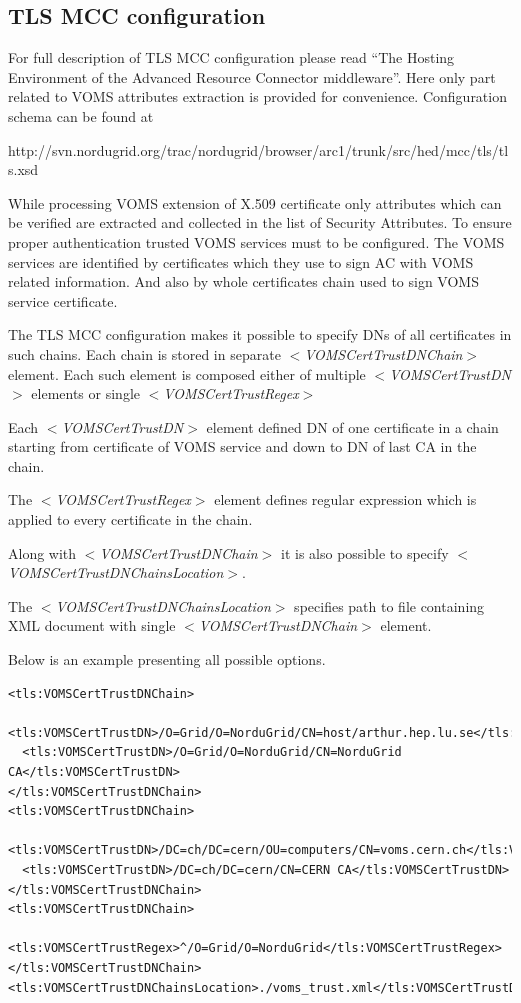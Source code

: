 \documentclass{article}                            %
\begin{document}
\subsection{TLS MCC configuration} %
\label{subsec:tlsmcc_conf}
For full description of TLS MCC configuration please read ``The Hosting Environment of the Advanced Resource Connector middleware''. Here only part related to VOMS attributes extraction is provided for convenience. Configuration schema can be found at 

http://svn.nordugrid.org/trac/nordugrid/browser/arc1/trunk/src/hed/mcc/tls/tls.xsd

While processing VOMS extension of X.509 certificate only attributes which can be verified are extracted and collected in the list of Security Attributes. To ensure proper authentication trusted VOMS services must to be configured. The VOMS services are identified by certificates which they use to sign AC with VOMS related information. And also by whole certificates chain used to sign VOMS service certificate. 

The TLS MCC configuration makes it possible to specify DNs of all certificates in such chains. Each chain is stored in separate \textit{$<$VOMSCertTrustDNChain$>$} element. Each such element is composed either of multiple \textit{$<$VOMSCertTrustDN$>$} elements or single \textit{$<$VOMSCertTrustRegex$>$}

Each \textit{$<$VOMSCertTrustDN$>$} element defined DN of one certificate in a chain starting from certificate of VOMS service and down to DN of last CA in the chain.

The \textit{$<$VOMSCertTrustRegex$>$} element defines regular expression which is applied to every certificate in the chain.

Along with \textit{$<$VOMSCertTrustDNChain$>$} it is also possible to specify \textit{$<$VOMSCertTrustDNChainsLocation$>$}.

The \textit{$<$VOMSCertTrustDNChainsLocation$>$} specifies path to file containing XML document with single \textit{$<$VOMSCertTrustDNChain$>$} element.

Below is an example presenting all possible options.

\begin{verbatim}
<tls:VOMSCertTrustDNChain> 
  <tls:VOMSCertTrustDN>/O=Grid/O=NorduGrid/CN=host/arthur.hep.lu.se</tls:VOMSCertTrustDN>
  <tls:VOMSCertTrustDN>/O=Grid/O=NorduGrid/CN=NorduGrid CA</tls:VOMSCertTrustDN>
</tls:VOMSCertTrustDNChain>
<tls:VOMSCertTrustDNChain>
  <tls:VOMSCertTrustDN>/DC=ch/DC=cern/OU=computers/CN=voms.cern.ch</tls:VOMSCertTrustDN>
  <tls:VOMSCertTrustDN>/DC=ch/DC=cern/CN=CERN CA</tls:VOMSCertTrustDN>
</tls:VOMSCertTrustDNChain>
<tls:VOMSCertTrustDNChain>
  <tls:VOMSCertTrustRegex>^/O=Grid/O=NorduGrid</tls:VOMSCertTrustRegex>
</tls:VOMSCertTrustDNChain>
<tls:VOMSCertTrustDNChainsLocation>./voms_trust.xml</tls:VOMSCertTrustDNChainsLocation>
\end{verbatim}
\end{document}

